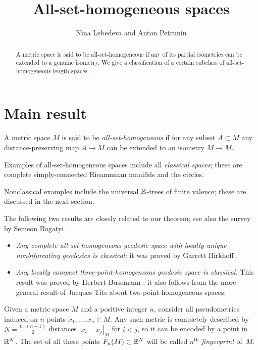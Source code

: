 \documentclass[a4paper,10pt]{article}
\def\thetitle{All-set-homogeneous spaces}
\def\theauthors{Nina Lebedeva and Anton Petrunin}
\begin{document}


\title{\thetitle}
\author{\theauthors}
\date{}
\maketitle

\begin{abstract}
A metric space is said to be all-set-homogeneous if any of its partial isometries can be extended to a genuine isometry.
We give a classification of a certain subclass of all-set-homogeneous length spaces.
\end{abstract}

\section{Main result}

A metric space $M$ is said to be \emph{all-set-homogeneous} if for any subset $A\subset M$ any distance-preserving map $A\to M$ can be extended to an isometry $M\to M$.

Examples of all-set-homogeneous spaces include all \emph{classical spaces};
these are complete simply-connected Rieamnnian maniflds and the circles.

Nonclassical examples include the universal $\mathbb{R}$-trees of finite valence;
these are discussed in the next section.

The following two results are closely related to our theorem; see also the survey by Semeon Bogatyi \cite{bogaty}.
\begin{itemize}
\item \emph{Any complete all-set-homogeneous geodesic space with locally unique nonbifurcating geodesics is classical;} it was proved by Garrett Birkhoff \cite{birkhoff}.
\item \emph{Any locally compact three-point-homogeneous geodesic space is classical.}
 This result was proved by Herbert Busemann \cite{busemann}; it also follows from the more general result of Jacques Tits \cite{tits} about two-point-homogeneous spaces.
\end{itemize}


Given a metric space $M$ and a positive integer $n$, consider all pseudometrics induced on $n$ points $x_1,\dots, x_n\in M$.
Any such metric is completely described by $N=\tfrac{n\cdot (n-1)}2$ distances $|x_i-x_j|_M$ for $i<j$, so it can be encoded by a point in $\mathbb{R}^N$.
The set of all these points $F_n(M)\subset \mathbb{R}^N$ will be called \emph{$n^\text{th}$ fingerprint} of~$M$.
\end{document}
